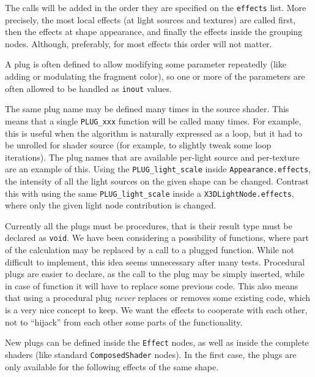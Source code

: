 \documentclass{egpubl}
\begin{document}
The calls will be added in the order they are specified on the
\texttt{effects} list. More precisely, the most local effects
(at light sources and textures) are called first, then the effects
at shape appearance, and finally the effects inside the grouping nodes.
Although, preferably, for most effects this order will not matter.

A plug is often defined to allow modifying some parameter
repeatedly (like adding or modulating the fragment color),
so one or more of the parameters are often allowed to be handled
as \texttt{inout} values.

The same plug name may be defined many times in the source shader.
This means that a single \texttt{PLUG\_xxx} function will be called
many times. For example, this is useful when the algorithm is naturally
expressed as a loop, but it had to be unrolled for shader source
(for example, to slightly tweak some loop iterations).
The plug names that are available per-light source and per-texture
are an example of this.
Using the \texttt{PLUG\_light\_scale}
inside \texttt{Appearance.effects}, the intensity
of all the light sources on the given shape can be changed. Contrast this with using
the same \texttt{PLUG\_light\_scale} inside a \texttt{X3DLightNode.effects},
where only the given light node contribution is changed.

Currently all the plugs must be procedures, that is their result type
must be declared as \texttt{void}. We have been considering
a possibility of functions, where part of the calculation may be replaced
by a call to a plugged function. While not difficult to implement,
this idea seems unnecessary after many tests.
Procedural plugs are easier to declare, as the call to the plug
may be simply inserted, while in case of function it will have to replace
some previous code. This also means that using a procedural plug
\textit{never} replaces or removes some existing code, which is a very nice
concept to keep. We want the effects to cooperate with each other,
not to ``hijack'' from each other some parts of the functionality.

New plugs can be defined inside the \texttt{Effect} nodes,
as well as inside the complete shaders (like standard
\texttt{ComposedShader} nodes).
In the first case, the plugs
are only available for the following effects of the same shape.
\end{document}
